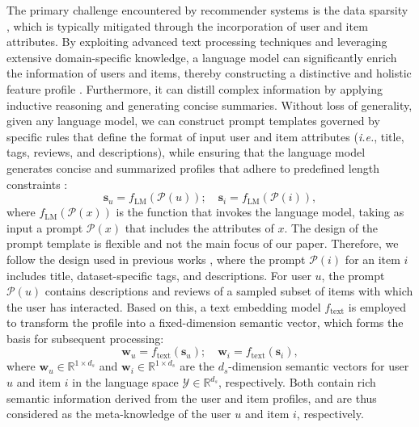 \documentclass[sigconf]{acmart}
\begin{document}
The primary challenge encountered by recommender systems is the data sparsity \cite{yu2022graph, zhang2023revisiting}, which is typically mitigated through the incorporation of user and item attributes. By exploiting advanced text processing techniques and leveraging extensive domain-specific knowledge, a language model can significantly enrich the information of users and items, thereby constructing a distinctive and holistic feature profile \cite{ren2024representation}. Furthermore, it can distill complex information by applying inductive reasoning and generating concise summaries. Without loss of generality, given any language model, we can construct prompt templates governed by specific rules that define the format of input user and item attributes (\textit{i.e.}, title, tags, reviews, and descriptions), while ensuring that the language model generates concise and summarized profiles that adhere to predefined length constraints \cite{radford2021learning}:
\begin{equation}
\label{prompt}
\mathbf s_u=f_{\text{LM}}(\mathcal P(u)); \quad \mathbf s_i=f_{\text{LM}}(\mathcal P(i)),
\end{equation}
where $f_{\text{LM}}(\mathcal P(x))$ is the function that invokes the language model, taking as input a prompt $\mathcal P(x)$ that includes the attributes of $x$. The design of the prompt template is flexible and not the main focus of our paper. Therefore, we follow the design used in previous works \cite{xi2024towards, ren2024representation}, where the prompt $\mathcal P(i)$ for an item $i$ includes title, dataset-specific tags, and descriptions. For user $u$, the prompt $\mathcal P(u)$ contains descriptions and reviews of a sampled subset of items with which the user has interacted. Based on this, a text embedding model $f_\text{text}$ \cite{su2023one} is employed to transform the profile into a fixed-dimension semantic vector, which forms the basis for subsequent processing:
\begin{equation}
\label{text_embedding}
\mathbf w_u = f_\text{text}(\mathbf s_u); \quad \mathbf w_i=f_\text{text}(\mathbf s_i),
\end{equation}
where $\mathbf w_u \in \mathbb R^{1\times d_s}$ and $\mathbf w_i \in \mathbb R^{1\times d_s}$ are the 
$d_s$-dimension semantic vectors for user $u$ and item $i$ in the language space $\mathcal Y \in \mathbb R^{d_s}$, respectively. Both contain rich semantic information derived from the user and item profiles, and are thus considered as the meta-knowledge of the user $u$ and item $i$, respectively. 
\end{document}
